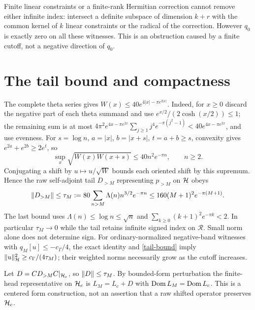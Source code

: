 \documentclass[11pt]{article}
\begin{document}
Finite linear constraints or a finite-rank Hermitian correction cannot remove either infinite index: intersect a definite subspace of dimension $k+r$ with the common kernel of $k$ linear constraints or the radical of the correction. However $q_0$ is exactly zero on all these witnesses. This is an obstruction caused by a finite cutoff, not a negative direction of $q_0$.

\section{The tail bound and compactness}\label{compact}
The complete theta series gives $W(x)\le40e^{4|x|-\pi e^{2|x|}}$. Indeed, for $x\ge0$ discard the negative part of each theta summand and use $e^{x/2}/(2\cosh(x/2))\le1$; the remaining sum is at most $4\pi^2e^{4x-\pi e^{2x}}\sum_{j\ge1}j^4e^{-\pi(j^2-1)}<40e^{4x-\pi e^{2x}}$, and use evenness. For $s=\log n$, $a=|x|$, $b=|x+s|$, $t=a+b\ge s$, convexity gives $e^{2a}+e^{2b}\ge2e^t$, so
\[\sup_x\sqrt{W(x)W(x+s)}\le40 n^2e^{-\pi n},\qquad n\ge2.\]
Conjugating a shift by $u\mapsto u/\sqrt W$ bounds each oriented shift by this supremum. Hence the raw self-adjoint tail $D_{>M}$ representing $p_{>M}$ on $\mathcal H$ obeys
\begin{equation}\label{tail-bound}
 \lVert D_{>M}\rVert\le\tau_M:=80\sum_{n>M}\Lambda(n)n^{3/2}e^{-\pi n}
 \le160(M+1)^2e^{-\pi(M+1)}.
\end{equation}
The last bound uses $\Lambda(n)\le\log n\le\sqrt n$ and $\sum_{k\ge0}(k+1)^2e^{-\pi k}<2$. In particular $\tau_M\to0$ while the tail retains infinite signed index on $\mathcal R$. Small norm alone does not determine sign. For ordinary-normalized negative-band witnesses with $q_M[u]\le-c_\Gamma/4$, the exact identity and \eqref{tail-bound} imply $\lVert u\rVert_{\mathcal H}^2\ge c_\Gamma/(4\tau_M)$; their weighted norms necessarily grow as the cutoff increases.

Let $D=CD_{>M}C|_{\mathcal H_c}$, so $\lVert D\rVert\le\tau_M$. By bounded-form perturbation the finite-head representative on $\mathcal H_c$ is $L_M=L_c+D$ with $\operatorname{Dom} L_M=\operatorname{Dom} L_c$. This is a centered form construction, not an assertion that a raw shifted operator preserves $\mathcal H_c$.
\end{document}
